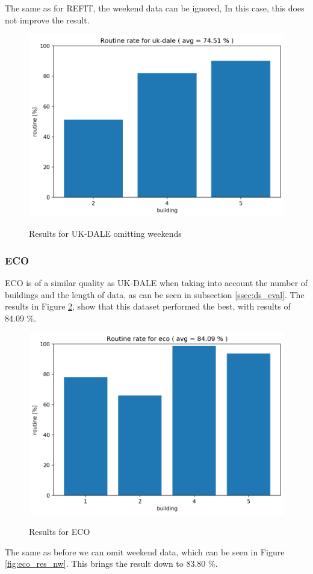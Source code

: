 The same as for REFIT, the weekend data can be ignored,
In this case, this does not improve the result. 

\begin{figure}[H]
	\centering
	\caption{Results for UK-DALE omitting weekends}
	\includegraphics[width=.7\textwidth]{Figures/EC/ukdale_nw_res.png}
	\label{fig:ukdale_res_nw}
\end{figure}

\subsubsection{ECO}

ECO is of a similar quality as UK-DALE when taking into account the number of buildings and the length of data, as can be seen in subsection \ref{ssec:ds_eval}.
The results in Figure \ref{fig:eco_res}, show that this dataset performed the best, with results of 84.09 \%.

\begin{figure}[H]
	\centering
	\caption{Results for ECO}
	\includegraphics[width=.7\textwidth]{Figures/EC/eco_res_nw_1.png}
	\label{fig:eco_res}
\end{figure}

The same as before we can omit weekend data, which can be seen in Figure \ref{fig:eco_res_nw}. This brings the result down to 83.80 \%. 

